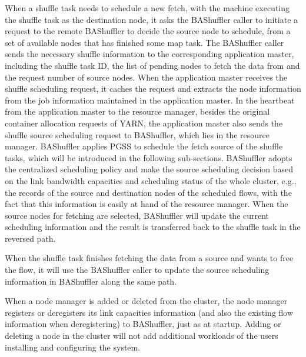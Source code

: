 \documentclass[10pt,journal,compsoc]{IEEEtran}
\begin{document}
When a shuffle task needs to schedule a new fetch, with the machine executing the shuffle task as the destination node, it asks the
BAShuffler caller to initiate a request to the remote BAShuffler
to decide the source node to schedule, from a set of available nodes that has finished some map task.
The BAShuffler caller sends the necessary shuffle information to the
corresponding application master,
including the shuffle task ID, the list of pending nodes to fetch
the data from and the request number of source nodes.
When the application master receives the shuffle scheduling request, 
it caches the request and extracts the node information from the job
information maintained in the application master.
In the heartbeat from the application master to the resource manager,
besides the original container allocation requests
of YARN, the application master also sends the shuffle source
scheduling request to BAShuffler, which lies in the resource manager.
BAShuffler applies PGSS to schedule the fetch source of the shuffle tasks, which will be introduced in the following sub-sections. 
BAShuffler adopts the centralized scheduling policy and make the source scheduling decision based on the link
bandwidth capacities and scheduling status of the whole cluster, e.g., the records of the source and
destination nodes of the scheduled flows, 
with the fact that this information is easily at hand of the resource manager.
When the source nodes for fetching are selected, BAShuffler will
update the current scheduling information and
the result is transferred back to the shuffle task in the reversed path. 

When the shuffle task finishes fetching the data from a source and
wants to free the flow,
it will use the BAShuffler caller to update the source scheduling
information in BAShuffler along the same path.

When a node manager is added or deleted from the cluster, 
the node manager registers or deregisters its link capacities information 
(and also the existing flow information when deregistering) to BAShuffler, 
just as at startup. 
Adding or deleting a node in the cluster will not add additional workloads 
of the users installing and configuring the system. 
\end{document}
